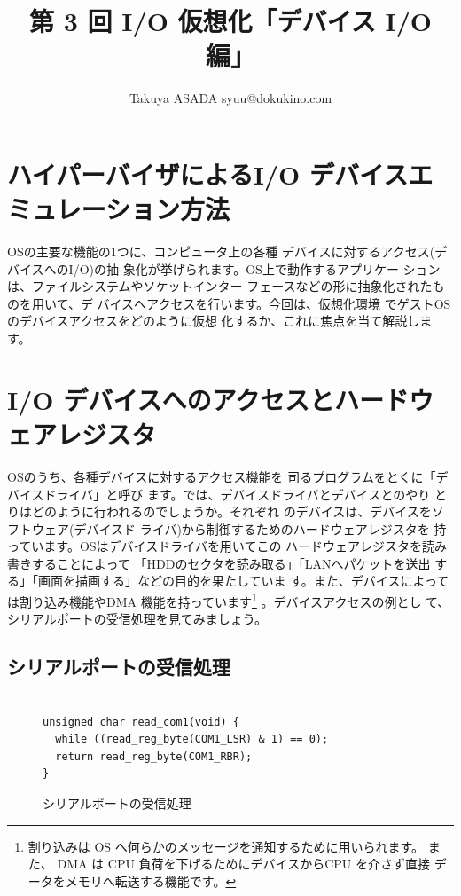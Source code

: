 
\title{第 3 回 I/O 仮想化「デバイス I/O 編」}
\author{Takuya ASADA syuu@dokukino.com}

\maketitle

\section{ハイパーバイザによるI/O デバイスエミュレーション方法}

 OSの主要な機能の1つに、コンピュータ上の各種
デバイスに対するアクセス(デバイスへのI/O)の抽
象化が挙げられます。OS上で動作するアプリケー
ションは、ファイルシステムやソケットインター
フェースなどの形に抽象化されたものを用いて、デ
バイスへアクセスを行います。今回は、仮想化環境
でゲストOSのデバイスアクセスをどのように仮想
化するか、これに焦点を当て解説します。


\section{I/O デバイスへのアクセスとハードウェアレジスタ}

 OSのうち、各種デバイスに対するアクセス機能を
司るプログラムをとくに「デバイスドライバ」と呼び
ます。では、デバイスドライバとデバイスとのやり
とりはどのように行われるのでしょうか。それぞれ
のデバイスは、デバイスをソフトウェア(デバイスド
ライバ)から制御するためのハードウェアレジスタを
持っています。OSはデバイスドライバを用いてこの
ハードウェアレジスタを読み書きすることによって
「HDDのセクタを読み取る」「LANへパケットを送出
する」「画面を描画する」などの目的を果たしていま
す。また、デバイスによっては割り込み機能やDMA
機能を持っています\footnote{
割り込みは OS へ何らかのメッセージを通知するために用いられます。
また、 DMA は CPU 負荷を下げるためにデバイスからCPU を介さず直接
データをメモリへ転送する機能です。
}
。デバイスアクセスの例とし
て、シリアルポートの受信処理を見てみましょう。

\subsection*{シリアルポートの受信処理}

\begin{figure}\centering
\begin{verbatim}

unsigned char read_com1(void) {
  while ((read_reg_byte(COM1_LSR) & 1) == 0);
  return read_reg_byte(COM1_RBR);
}

\end{verbatim}
\caption{シリアルポートの受信処理}
\end{figure}

